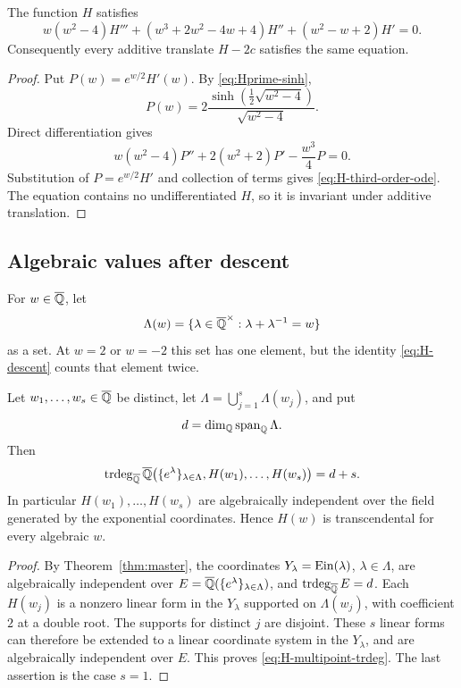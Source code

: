 \begin{proposition}
\label{prop:H-ode}
The function $H$ satisfies
\begin{equation}\label{eq:H-third-order-ode}
 w(w^2-4)H'''
 +(w^3+2w^2-4w+4)H''
 +(w^2-w+2)H'=0.
\end{equation}
Consequently every additive translate $H-2c$ satisfies the same equation.
\end{proposition}

\begin{proof}
Put $P(w)=e^{w/2}H'(w)$.  By \eqref{eq:Hprime-sinh},
\[
 P(w)=2\frac{\sinh(\frac12\sqrt{w^2-4})}{\sqrt{w^2-4}}.
\]
Direct differentiation gives
\[
 w(w^2-4)P''+2(w^2+2)P'-\frac{w^3}{4}P=0.
\]
Substitution of $P=e^{w/2}H'$ and collection of terms gives
\eqref{eq:H-third-order-ode}.  The equation contains no undifferentiated
$H$, so it is invariant under additive translation.
\end{proof}

\subsection{Algebraic values after descent}

For $w\in\overline{\mathbb Q}$, let
\[
 \Lambda(w)=\{\lambda\in\overline{\mathbb Q}^\times:
                    \lambda+\lambda^{-1}=w\}
\]
as a set.  At $w=2$ or $w=-2$ this set has one element, but the identity
\eqref{eq:H-descent} counts that element twice.

\begin{theorem}
\label{thm:H-multipoint-descent}
Let $w_1,\ldots,w_s\in\overline{\mathbb Q}$ be distinct, let
$\Lambda=\bigcup_{j=1}^s\Lambda(w_j)$, and put
\[
 d=\dim_{\mathbb Q}\operatorname{span}_{\mathbb Q}\Lambda.
\]
Then
\begin{equation}\label{eq:H-multipoint-trdeg}
 \operatorname{trdeg}_{\overline{\mathbb Q}}
 \overline{\mathbb Q}\bigl(\{e^\lambda\}_{\lambda\in\Lambda},
             H(w_1),\ldots,H(w_s)\bigr)=d+s.
\end{equation}
In particular $H(w_1),\ldots,H(w_s)$ are algebraically independent over
the field generated by the exponential coordinates.  Hence $H(w)$ is
transcendental for every algebraic $w$.
\end{theorem}

\begin{proof}
By Theorem~\ref{thm:master}, the coordinates
$Y_\lambda=\operatorname{Ein}(\lambda)$, $\lambda\in\Lambda$, are algebraically
independent over
$E=\overline{\mathbb Q}(\{e^\lambda\}_{\lambda\in\Lambda})$, and
$\operatorname{trdeg}_{\overline{\mathbb Q}}E=d$.  Each $H(w_j)$ is a nonzero linear form
in the $Y_\lambda$ supported on $\Lambda(w_j)$, with coefficient $2$ at a
double root.  The supports for distinct $j$ are disjoint.  These $s$ linear
forms can therefore be extended to a linear coordinate system in the
$Y_\lambda$, and are algebraically independent over $E$.  This proves
\eqref{eq:H-multipoint-trdeg}.  The last assertion is the case $s=1$.
\end{proof}

